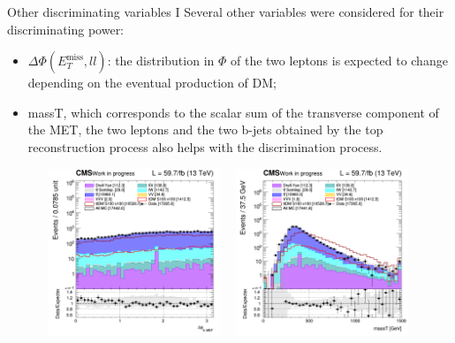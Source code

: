 \documentclass[8pt]{beamer}
\begin{document}
\begin{frame}{Other discriminating variables I}
\justifying
Several other variables were considered for their discriminating power:
\begin{itemize}
\justifying
\item $\Delta \Phi(E_{T}^{\text{miss}}, ll)$: the distribution in $\Phi$ of the two leptons is expected to change depending on the eventual production of DM;
\item massT, which corresponds to the scalar sum of the transverse component of the MET, the two leptons and the two b-jets obtained by the top reconstruction process also helps with the discrimination process.
\end{itemize} \vfill

\begin{figure}[htbp]
\centering
\begin{minipage}[b]{.49\textwidth}
\includegraphics[width=5.5cm, height=5cm]{figs/2018/SmearSR-ttDM-scalar100/log_cratio_topCR_ll_dphillmet.png}
\end{minipage}\hfill
\begin{minipage}[b]{.49\textwidth}
\includegraphics[width=5.5cm, height=5cm]{figs/2018/SmearSR-ttDM-scalar100/log_cratio_topCR_ll_massT.png}
\end{minipage} \hfill
\end{figure} \vfill
\end{frame}
\end{document}
